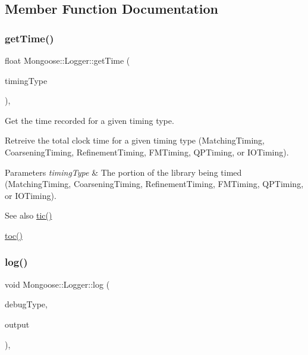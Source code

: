 \subsection{Member Function Documentation}
\hypertarget{class_mongoose_1_1_logger_a9f74771ff530c41f98ee090f3a1897eb}{}\label{class_mongoose_1_1_logger_a9f74771ff530c41f98ee090f3a1897eb} 
\subsubsection{\texorpdfstring{get\+Time()}{getTime()}}
{\footnotesize\ttfamily float Mongoose\+::\+Logger\+::get\+Time (\begin{DoxyParamCaption}\item[{Timing\+Type}]{timing\+Type }\end{DoxyParamCaption})\hspace{0.3cm}{\ttfamily [inline]}, {\ttfamily [static]}}



Get the time recorded for a given timing type. 

Retreive the total clock time for a given timing type (Matching\+Timing, Coarsening\+Timing, Refinement\+Timing, F\+M\+Timing, Q\+P\+Timing, or I\+O\+Timing).


\begin{DoxyParams}{Parameters}
{\em timing\+Type} & The portion of the library being timed (Matching\+Timing, Coarsening\+Timing, Refinement\+Timing, F\+M\+Timing, Q\+P\+Timing, or I\+O\+Timing).\\
\hline
\end{DoxyParams}
\begin{DoxySeeAlso}{See also}
\hyperlink{class_mongoose_1_1_logger_afaa4ac7914bc5536fbe765ad2b4806d8}{tic()} 

\hyperlink{class_mongoose_1_1_logger_af50c5bd571bfae78a27ff49b2c5bb6d3}{toc()} 
\end{DoxySeeAlso}
\hypertarget{class_mongoose_1_1_logger_a130663fe3867cc5adae16dcf7f65f2a5}{}\label{class_mongoose_1_1_logger_a130663fe3867cc5adae16dcf7f65f2a5} 
\subsubsection{\texorpdfstring{log()}{log()}}
{\footnotesize\ttfamily void Mongoose\+::\+Logger\+::log (\begin{DoxyParamCaption}\item[{Debug\+Type}]{debug\+Type,  }\item[{std\+::string}]{output }\end{DoxyParamCaption})\hspace{0.3cm}{\ttfamily [inline]}, {\ttfamily [static]}}



